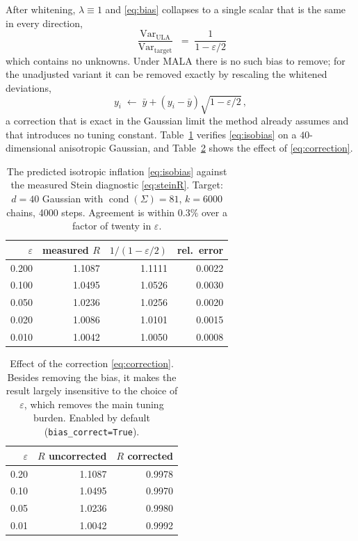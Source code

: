 \documentclass[11pt]{article}
\newcommand{\Var}{\operatorname{Var}}
\newcommand{\code}[1]{\texttt{\small #1}}
\begin{document}
After whitening, $\lambda \equiv 1$ and \eqref{eq:bias} collapses to a single scalar that is the
same in every direction,
\begin{equation}
  \boxed{\;\frac{\Var_{\text{ULA}}}{\Var_{\text{target}}} \;=\; \frac{1}{1-\varepsilon/2}\;}
  \label{eq:isobias}
\end{equation}
which contains no unknowns. Under MALA there is no such bias to remove; for the unadjusted
variant it can be removed exactly by rescaling the whitened deviations,
\begin{equation}
  y_i \;\longleftarrow\; \bar{y} + (y_i - \bar{y})\sqrt{1-\varepsilon/2}\,,
  \label{eq:correction}
\end{equation}
a correction that is exact in the Gaussian limit the method already assumes and that introduces
no tuning constant. Table~\ref{tab:bias} verifies \eqref{eq:isobias} on a $40$-dimensional
anisotropic Gaussian, and Table~\ref{tab:corr} shows the effect of \eqref{eq:correction}.

\begin{table}[t]
\centering
\begin{tabular}{rrrr}
\toprule
$\varepsilon$ & measured $R$ & $1/(1-\varepsilon/2)$ & rel.\ error \\
\midrule
0.200 & 1.1087 & 1.1111 & 0.0022 \\
0.100 & 1.0495 & 1.0526 & 0.0030 \\
0.050 & 1.0236 & 1.0256 & 0.0020 \\
0.020 & 1.0086 & 1.0101 & 0.0015 \\
0.010 & 1.0042 & 1.0050 & 0.0008 \\
\bottomrule
\end{tabular}
\caption{The predicted isotropic inflation \eqref{eq:isobias} against the measured Stein
diagnostic \eqref{eq:steinR}. Target: $d=40$ Gaussian with $\operatorname{cond}(\Sigma)=81$,
$k=6000$ chains, 4000 steps. Agreement is within $0.3\%$ over a factor of twenty in
$\varepsilon$.}
\label{tab:bias}
\end{table}

\begin{table}[t]
\centering
\begin{tabular}{rrr}
\toprule
$\varepsilon$ & $R$ uncorrected & $R$ corrected \\
\midrule
0.20 & 1.1087 & 0.9978 \\
0.10 & 1.0495 & 0.9970 \\
0.05 & 1.0236 & 0.9980 \\
0.01 & 1.0042 & 0.9992 \\
\bottomrule
\end{tabular}
\caption{Effect of the correction \eqref{eq:correction}. Besides removing the bias, it makes the
result largely insensitive to the choice of $\varepsilon$, which removes the main tuning burden.
Enabled by default (\code{bias\_correct=True}).}
\label{tab:corr}
\end{table}
\end{document}
